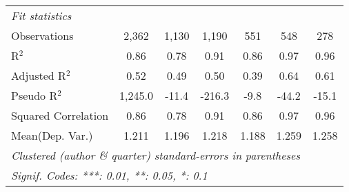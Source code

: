 \begin{tabular}{lcccccc}
   \midrule
   \emph{Fit statistics}\\
   Observations                                               & 2,362          & 1,130       & 1,190        & 551        & 548           & 278\\  
   R$^2$                                                      & 0.86           & 0.78        & 0.91         & 0.86       & 0.97          & 0.96\\  
   Adjusted R$^2$                                             & 0.52           & 0.49        & 0.50         & 0.39       & 0.64          & 0.61\\  
   Pseudo R$^2$                                               & 1,245.0        & -11.4       & -216.3       & -9.8       & -44.2         & -15.1\\  
   Squared Correlation                                        & 0.86           & 0.78        & 0.91         & 0.86       & 0.97          & 0.96\\  
Mean(Dep. Var.) & 1.211 & 1.196 & 1.218 & 1.188 & 1.259 & 1.258 \\
   \midrule \midrule
   \multicolumn{7}{l}{\emph{Clustered (author \& quarter) standard-errors in parentheses}}\\
   \multicolumn{7}{l}{\emph{Signif. Codes: ***: 0.01, **: 0.05, *: 0.1}}\\
\end{tabular}
\par\endgroup
